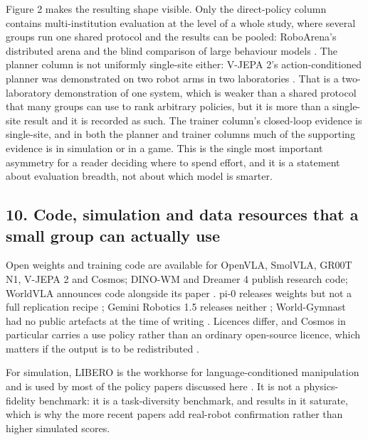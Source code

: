 \documentclass[
  10pt,
  english,
]{article}
\begin{document}
Figure 2 makes the resulting shape visible. Only the direct-policy
column contains multi-institution evaluation at the level of a whole
study, where several groups run one shared protocol and the results can
be pooled: RoboArena's distributed arena and the blind comparison of
large behaviour models \citep{roboarena, lbm}. The planner column is not
uniformly single-site either: V-JEPA 2's action-conditioned planner was
demonstrated on two robot arms in two laboratories \citep{vjepa2}. That
is a two-laboratory demonstration of one system, which is weaker than a
shared protocol that many groups can use to rank arbitrary policies, but
it is more than a single-site result and it is recorded as such. The
trainer column's closed-loop evidence is single-site, and in both the
planner and trainer columns much of the supporting evidence is in
simulation or in a game. This is the single most important asymmetry for
a reader deciding where to spend effort, and it is a statement about
evaluation breadth, not about which model is smarter.

\hypertarget{code-simulation-and-data-resources-that-a-small-group-can-actually-use}{%
\subsection{10. Code, simulation and data resources that a small group
can actually
use}\label{code-simulation-and-data-resources-that-a-small-group-can-actually-use}}

Open weights and training code are available for OpenVLA, SmolVLA, GR00T
N1, V-JEPA 2 and Cosmos; DINO-WM and Dreamer 4 publish research code;
WorldVLA announces code alongside its paper
\citep{openvla, smolvla, groot_n1, vjepa2, cosmos, dino_wm, dreamer4, worldvla}.
pi-0 releases weights but not a full replication recipe \citep{pi0};
Gemini Robotics 1.5 releases neither \citep{gemini_robotics15};
World-Gymnast had no public artefacts at the time of writing
\citep{world_gymnast}. Licences differ, and Cosmos in particular carries
a use policy rather than an ordinary open-source licence, which matters
if the output is to be redistributed \citep{cosmos}.

For simulation, LIBERO is the workhorse for language-conditioned
manipulation and is used by most of the policy papers discussed here
\citep{libero}. It is not a physics-fidelity benchmark: it is a
task-diversity benchmark, and results in it saturate, which is why the
more recent papers add real-robot confirmation rather than higher
simulated scores.
\end{document}

